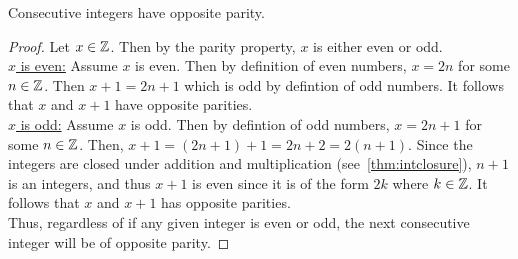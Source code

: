 \begin{tcolorbox}[colback=pink!70]
    \begin{theorem}
        Consecutive integers have opposite parity.
    \end{theorem}
    \begin{proof}
        Let $x \in \mathbb Z$. Then by the parity property, $x$ is either even or odd. \\
        \hspace*{2em}\underline{$x$ is even:} Assume $x$ is even. Then by definition of even numbers, $x = 2n$ for some $n \in \mathbb Z$. Then $x+1 = 2n+1$ which is odd by defintion of odd numbers. It follows that $x$ and $x+1$ have opposite parities.  \\
        \hspace*{2em}\underline{$x$ is odd:} Assume $x$ is odd. Then by defintion of odd numbers, $x = 2n+1$ for some $n\in\mathbb Z$. Then, $x+1 = (2n + 1) + 1 = 2n + 2 = 2(n + 1)$. Since the integers are closed under addition and multiplication (see~\ref{thm:intclosure}), $n+1$ is an integers, and thus $x+1$ is even since it is of the form $2k$ where $k \in \mathbb Z$. It follows that $x$ and $x+1$ has opposite parities. \\
        Thus, regardless of if any given integer is even or odd, the next consecutive integer will be of opposite parity.
    \end{proof}
\end{tcolorbox}